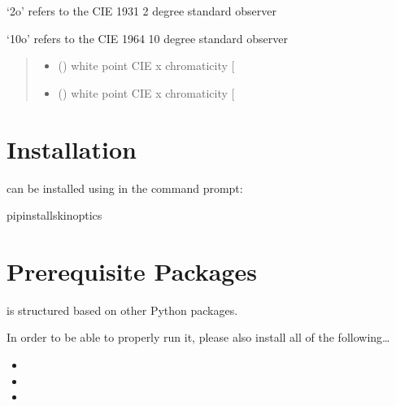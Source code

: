 \documentclass[letterpaper,10pt,english]{sphinxmanual}
\begin{document}
\begin{fulllineitems}
\begin{DUlineblock}{0em}
\item[] ‘2o’ refers to the CIE 1931 2 degree standard observer
\item[] ‘10o’ refers to the CIE 1964 10 degree standard observer
\end{DUlineblock}
\begin{quote}\begin{description}
\sphinxAtStartPar
\begin{itemize}
\item {} 
\sphinxAtStartPar
{} () \textendash{} white point CIE x chromaticity {[}\sphinxhyphen{}{]}

\item {} 
\sphinxAtStartPar
{} () \textendash{} white point CIE x chromaticity {[}\sphinxhyphen{}{]}

\end{itemize}


\end{description}\end{quote}

\end{fulllineitems}



\chapter{Installation}
\label{\detokenize{index:installation}}
\sphinxAtStartPar
{} can be installed using  in the command prompt:

\begin{sphinxVerbatim}[commandchars=\\\{\}]
pipinstallskinoptics
\end{sphinxVerbatim}


\chapter{Prerequisite Packages}
\label{\detokenize{index:prerequisite-packages}}
\begin{DUlineblock}{0em}
\item[]  is structured based on other Python packages.
\item[] In order to be able to properly run it, please also install all of the following…
\end{DUlineblock}
\begin{itemize}
\item {} 
\sphinxAtStartPar
{}

\item {} 
\sphinxAtStartPar
{}

\item {} 
\sphinxAtStartPar
{}

\end{itemize}
\end{document}
